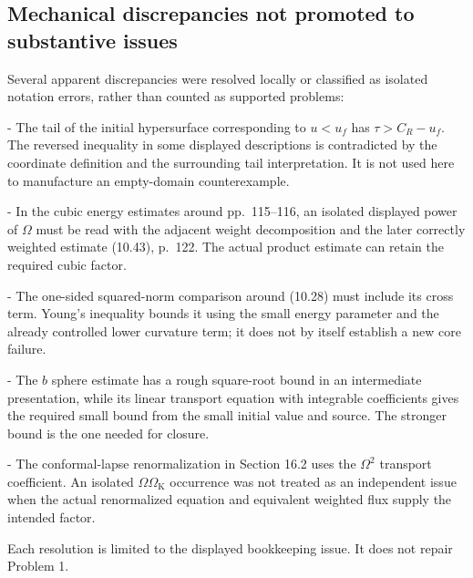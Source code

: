 \documentclass[10pt]{article}
\begin{document}
\subsection*{Mechanical discrepancies not promoted to substantive issues}
Several apparent discrepancies were resolved locally or classified as isolated notation errors, rather than counted as supported problems:\par
- The tail of the initial hypersurface corresponding to \(u<u_f\) has \(\tau>C_R-u_f\). The reversed inequality in some displayed descriptions is contradicted by the coordinate definition and the surrounding tail interpretation. It is not used here to manufacture an empty-domain counterexample.\par
- In the cubic energy estimates around pp. 115–116, an isolated displayed power of \(\Omega\) must be read with the adjacent weight decomposition and the later correctly weighted estimate (10.43), p. 122. The actual product estimate can retain the required cubic factor.\par
- The one-sided squared-norm comparison around (10.28) must include its cross term. Young’s inequality bounds it using the small energy parameter and the already controlled lower curvature term; it does not by itself establish a new core failure.\par
- The \(b\) sphere estimate has a rough square-root bound in an intermediate presentation, while its linear transport equation with integrable coefficients gives the required small bound from the small initial value and source. The stronger bound is the one needed for closure.\par
- The conformal-lapse renormalization in Section 16.2 uses the \(\Omega^2\) transport coefficient. An isolated \(\Omega\Omega_{\mathrm K}\) occurrence was not treated as an independent issue when the actual renormalized equation and equivalent weighted flux supply the intended factor.\par
Each resolution is limited to the displayed bookkeeping issue. It does not repair Problem 1.\par
\end{document}
